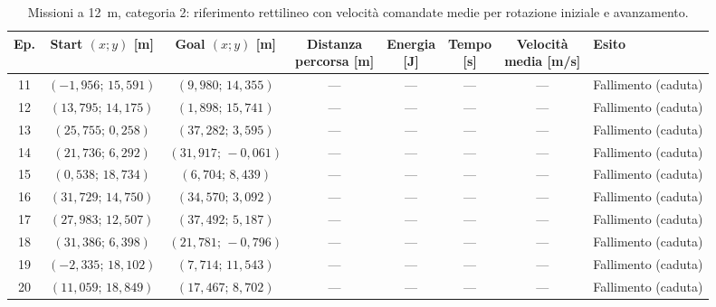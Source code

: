 \begin{table}[H]
\centering
\caption{Missioni a 12~m, categoria 2: riferimento rettilineo con velocità comandate medie per rotazione iniziale e avanzamento.}
\label{tab:big-map-12m-baseline-cat2}
\begingroup
\fontsize{9}{11}\selectfont
\setlength{\tabcolsep}{2.5pt}
\renewcommand{\arraystretch}{1.2}
\begin{tabular}{@{}c cc cccc l@{}}
\toprule
Ep. & \shortstack{Start $(x;y)$\\{}[m]} & \shortstack{Goal $(x;y)$\\{}[m]} & \shortstack{Distanza\\percorsa [m]} & \shortstack{Energia\\{}[J]} & \shortstack{Tempo\\{}[s]} & \shortstack{Velocità\\media [m/s]} & Esito \\
\midrule
11 & $(-1{,}956;\,15{,}591)$ & $(9{,}980;\,14{,}355)$ & --- & --- & --- & --- & Fallimento (caduta) \\
12 & $(13{,}795;\,14{,}175)$ & $(1{,}898;\,15{,}741)$ & --- & --- & --- & --- & Fallimento (caduta) \\
13 & $(25{,}755;\,0{,}258)$ & $(37{,}282;\,3{,}595)$ & --- & --- & --- & --- & Fallimento (caduta) \\
14 & $(21{,}736;\,6{,}292)$ & $(31{,}917;\,-0{,}061)$ & --- & --- & --- & --- & Fallimento (caduta) \\
15 & $(0{,}538;\,18{,}734)$ & $(6{,}704;\,8{,}439)$ & --- & --- & --- & --- & Fallimento (caduta) \\
16 & $(31{,}729;\,14{,}750)$ & $(34{,}570;\,3{,}092)$ & --- & --- & --- & --- & Fallimento (caduta) \\
17 & $(27{,}983;\,12{,}507)$ & $(37{,}492;\,5{,}187)$ & --- & --- & --- & --- & Fallimento (caduta) \\
18 & $(31{,}386;\,6{,}398)$ & $(21{,}781;\,-0{,}796)$ & --- & --- & --- & --- & Fallimento (caduta) \\
19 & $(-2{,}335;\,18{,}102)$ & $(7{,}714;\,11{,}543)$ & --- & --- & --- & --- & Fallimento (caduta) \\
20 & $(11{,}059;\,18{,}849)$ & $(17{,}467;\,8{,}702)$ & --- & --- & --- & --- & Fallimento (caduta) \\
\bottomrule
\end{tabular}
\endgroup
\end{table}

